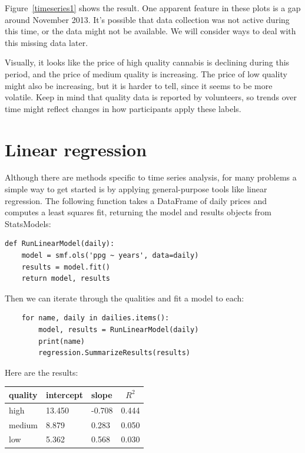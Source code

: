 \documentclass[12pt]{book}
\begin{document}
Figure~\ref{timeseries1} shows the result.  One apparent feature in
these plots is a gap around November 2013.  It's possible that data
collection was not active during this time, or the data might not
be available.  We will consider ways to deal with this missing data
later.

Visually, it looks like the price of high quality cannabis is
declining during this period, and the price of medium quality is
increasing.  The price of low quality might also be increasing, but it
is harder to tell, since it seems to be more volatile.  Keep in mind
that quality data is reported by volunteers, so trends over time
might reflect changes in how participants apply these labels.


\section{Linear regression}
\label{timeregress}

Although there are methods specific to time series analysis, for many
problems a simple way to get started is by applying general-purpose
tools like linear regression.  The following function takes a
DataFrame of daily prices and computes a least squares fit, returning
the model and results objects from StatsModels:

\begin{verbatim}
def RunLinearModel(daily):
    model = smf.ols('ppg ~ years', data=daily)
    results = model.fit()
    return model, results
\end{verbatim}

Then we can iterate through the qualities and fit a model to
each:

\begin{verbatim}
    for name, daily in dailies.items():
        model, results = RunLinearModel(daily)
        print(name)
        regression.SummarizeResults(results)
\end{verbatim}

Here are the results:

\begin{center}
\begin{tabular}{|l|l|l|c|} \hline
quality & intercept & slope & $R^2$ \\ \hline
high    & 13.450  & -0.708  & 0.444 \\
medium  &  8.879  & 0.283   & 0.050 \\
low     &  5.362  & 0.568   & 0.030 \\
\hline
\end{tabular}
\end{center}
\end{document}
